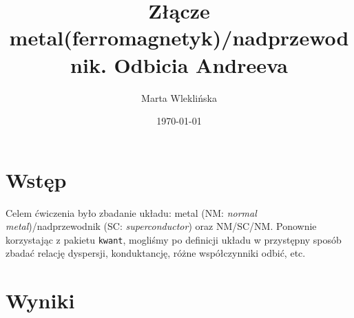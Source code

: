 \documentclass{article}
\title{Złącze metal(ferromagnetyk)/nadprzewodnik. 
Odbicia Andreeva}
\author{Marta Wleklińska}
\date{\today}
\begin{document}
\maketitle

\section{Wstęp}
Celem ćwiczenia było zbadanie układu: metal (NM: \textit{normal metal})/nadprzewodnik (SC: \textit{superconductor}) oraz NM/SC/NM.
Ponownie korzystając z pakietu \texttt{kwant}, mogliśmy po definicji układu w przystępny sposób zbadać relację dyspersji, konduktancję, różne współczynniki odbić, etc.
\section{Wyniki}
\end{document}
